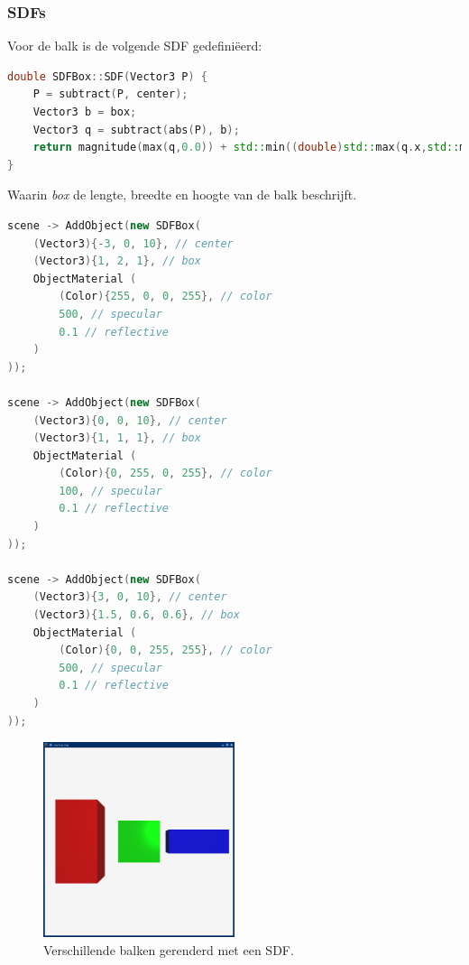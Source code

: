 \documentclass[12pt, a4paper]{article}
\begin{document}
\subsubsection{SDFs}

Voor de balk is de volgende SDF gedefiniëerd:
\begin{lstlisting}[language=C++]
double SDFBox::SDF(Vector3 P) {
    P = subtract(P, center);
    Vector3 b = box;
    Vector3 q = subtract(abs(P), b);
    return magnitude(max(q,0.0)) + std::min((double)std::max(q.x,std::max(q.y,q.z)),0.0);
}
\end{lstlisting}
Waarin \emph{box} de lengte, breedte en hoogte van de balk beschrijft.

\begin{lstlisting}[language=C++]
scene -> AddObject(new SDFBox(
    (Vector3){-3, 0, 10}, // center
    (Vector3){1, 2, 1}, // box
    ObjectMaterial (
        (Color){255, 0, 0, 255}, // color
        500, // specular
        0.1 // reflective
    )
));

scene -> AddObject(new SDFBox(
    (Vector3){0, 0, 10}, // center
    (Vector3){1, 1, 1}, // box
    ObjectMaterial (
        (Color){0, 255, 0, 255}, // color
        100, // specular
        0.1 // reflective
    )
));

scene -> AddObject(new SDFBox(
    (Vector3){3, 0, 10}, // center
    (Vector3){1.5, 0.6, 0.6}, // box
    ObjectMaterial (
        (Color){0, 0, 255, 255}, // color
        500, // specular
        0.1 // reflective
    )
));
\end{lstlisting}

\begin{figure}[h]
    \centering
    \includegraphics[width=0.50\textwidth]{renders/boxes.png}
    \caption{Verschillende balken gerenderd met een SDF.}
    \label{fig:boxes}
\end{figure}
\end{document}
